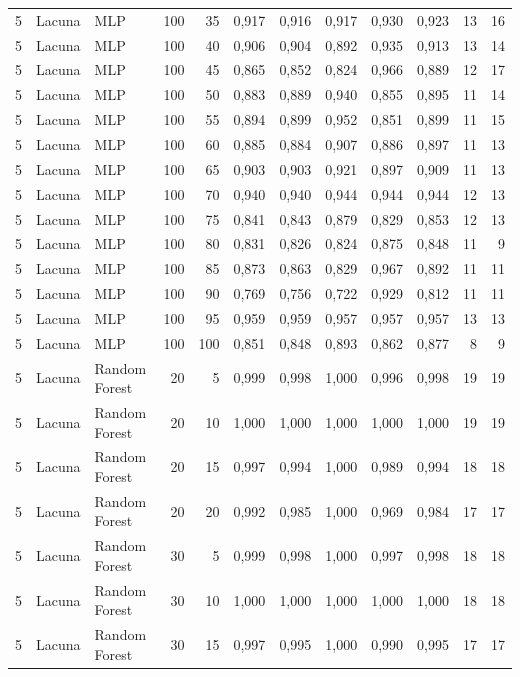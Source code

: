 \begin{longtable}{@{}rllrrrrrrrrr@{}}
5 & Lacuna & MLP & 100 & 35 & 0,917 & 0,916 & 0,917 & 0,930 & 0,923 & 13 & 16 \\
5 & Lacuna & MLP & 100 & 40 & 0,906 & 0,904 & 0,892 & 0,935 & 0,913 & 13 & 14 \\
5 & Lacuna & MLP & 100 & 45 & 0,865 & 0,852 & 0,824 & 0,966 & 0,889 & 12 & 17 \\
5 & Lacuna & MLP & 100 & 50 & 0,883 & 0,889 & 0,940 & 0,855 & 0,895 & 11 & 14 \\
5 & Lacuna & MLP & 100 & 55 & 0,894 & 0,899 & 0,952 & 0,851 & 0,899 & 11 & 15 \\
5 & Lacuna & MLP & 100 & 60 & 0,885 & 0,884 & 0,907 & 0,886 & 0,897 & 11 & 13 \\
5 & Lacuna & MLP & 100 & 65 & 0,903 & 0,903 & 0,921 & 0,897 & 0,909 & 11 & 13 \\
5 & Lacuna & MLP & 100 & 70 & 0,940 & 0,940 & 0,944 & 0,944 & 0,944 & 12 & 13 \\
5 & Lacuna & MLP & 100 & 75 & 0,841 & 0,843 & 0,879 & 0,829 & 0,853 & 12 & 13 \\
5 & Lacuna & MLP & 100 & 80 & 0,831 & 0,826 & 0,824 & 0,875 & 0,848 & 11 & 9 \\
5 & Lacuna & MLP & 100 & 85 & 0,873 & 0,863 & 0,829 & 0,967 & 0,892 & 11 & 11 \\
5 & Lacuna & MLP & 100 & 90 & 0,769 & 0,756 & 0,722 & 0,929 & 0,812 & 11 & 11 \\
5 & Lacuna & MLP & 100 & 95 & 0,959 & 0,959 & 0,957 & 0,957 & 0,957 & 13 & 13 \\
5 & Lacuna & MLP & 100 & 100 & 0,851 & 0,848 & 0,893 & 0,862 & 0,877 & 8 & 9 \\
5 & Lacuna & Random Forest & 20 & 5 & 0,999 & 0,998 & 1,000 & 0,996 & 0,998 & 19 & 19 \\
5 & Lacuna & Random Forest & 20 & 10 & 1,000 & 1,000 & 1,000 & 1,000 & 1,000 & 19 & 19 \\
5 & Lacuna & Random Forest & 20 & 15 & 0,997 & 0,994 & 1,000 & 0,989 & 0,994 & 18 & 18 \\
5 & Lacuna & Random Forest & 20 & 20 & 0,992 & 0,985 & 1,000 & 0,969 & 0,984 & 17 & 17 \\
5 & Lacuna & Random Forest & 30 & 5 & 0,999 & 0,998 & 1,000 & 0,997 & 0,998 & 18 & 18 \\
5 & Lacuna & Random Forest & 30 & 10 & 1,000 & 1,000 & 1,000 & 1,000 & 1,000 & 18 & 18 \\
5 & Lacuna & Random Forest & 30 & 15 & 0,997 & 0,995 & 1,000 & 0,990 & 0,995 & 17 & 17 \\

\end{longtable}

